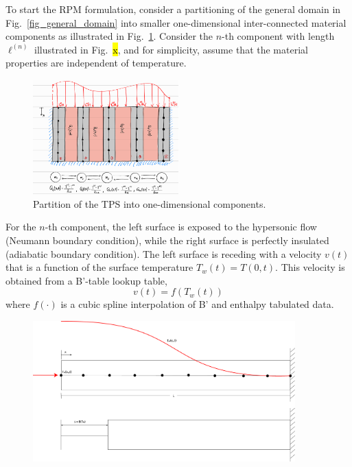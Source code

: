 To start the RPM formulation, consider a partitioning of the general domain in Fig.~\ref{fig_general_domain} into smaller one-dimensional inter-connected material components as illustrated in Fig.~\ref{fig_domain_partition}. Consider the $n$-th component with length $\ell^{(n)}$ illustrated in Fig.~\hl{x}, and for simplicity, assume that the material properties are independent of temperature.

\begin{figure}
    \centering
    \includegraphics[width=0.5\textwidth]{./figs/domain_partition.png}
    \caption{Partition of the TPS into one-dimensional components.}
    \label{fig_domain_partition}
\end{figure}

For the $n$-th component, the left surface is exposed to the hypersonic flow (Neumann boundary condition), while the right surface is perfectly insulated (adiabatic boundary condition). The left surface is receding with a velocity $v(t)$ that is a function of the surface temperature $T_w(t)=T(0,t)$. This velocity is obtained from a B'-table lookup table,
\[
    v(t) = f(T_w(t))
\]
where $f(\cdot)$ is a cubic spline interpolation of B' and enthalpy tabulated data.

\begin{figure}[h]
    \centering
    \includegraphics[width=0.9\textwidth]{./figs/ablation.png}
    \label{fig_ablation_domain}
\end{figure}

